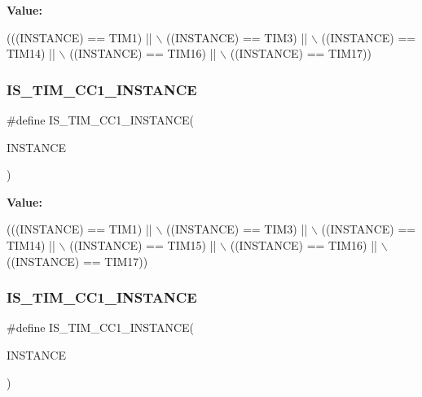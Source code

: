 {\bfseries Value\+:}
\begin{DoxyCode}
(((INSTANCE) == TIM1)    || \(\backslash\)
   ((INSTANCE) == TIM3)    || \(\backslash\)
   ((INSTANCE) == TIM14)   || \(\backslash\)
   ((INSTANCE) == TIM16)   || \(\backslash\)
   ((INSTANCE) == TIM17))
\end{DoxyCode}
\mbox{\label{group___exported__macro_ga0c02efc77b1bfb640d7f6593f58ad464}} 
\subsubsection{\texorpdfstring{I\+S\+\_\+\+T\+I\+M\+\_\+\+C\+C1\+\_\+\+I\+N\+S\+T\+A\+N\+CE}{IS\_TIM\_CC1\_INSTANCE}\hspace{0.1cm}{\footnotesize\ttfamily [2/16]}}
{\footnotesize\ttfamily \#define I\+S\+\_\+\+T\+I\+M\+\_\+\+C\+C1\+\_\+\+I\+N\+S\+T\+A\+N\+CE(\begin{DoxyParamCaption}\item[{}]{I\+N\+S\+T\+A\+N\+CE }\end{DoxyParamCaption})}

{\bfseries Value\+:}
\begin{DoxyCode}
(((INSTANCE) == TIM1)    || \(\backslash\)
   ((INSTANCE) == TIM3)    || \(\backslash\)
   ((INSTANCE) == TIM14)   || \(\backslash\)
   ((INSTANCE) == TIM15)   || \(\backslash\)
   ((INSTANCE) == TIM16)   || \(\backslash\)
   ((INSTANCE) == TIM17))
\end{DoxyCode}
\mbox{\label{group___exported__macro_ga0c02efc77b1bfb640d7f6593f58ad464}} 
\subsubsection{\texorpdfstring{I\+S\+\_\+\+T\+I\+M\+\_\+\+C\+C1\+\_\+\+I\+N\+S\+T\+A\+N\+CE}{IS\_TIM\_CC1\_INSTANCE}\hspace{0.1cm}{\footnotesize\ttfamily [3/16]}}
{\footnotesize\ttfamily \#define I\+S\+\_\+\+T\+I\+M\+\_\+\+C\+C1\+\_\+\+I\+N\+S\+T\+A\+N\+CE(\begin{DoxyParamCaption}\item[{}]{I\+N\+S\+T\+A\+N\+CE }\end{DoxyParamCaption})}

